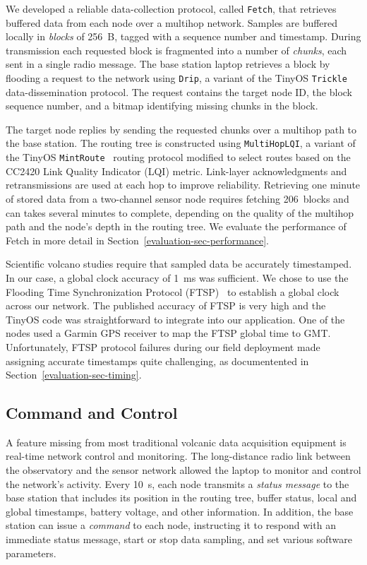 We developed a reliable data-collection protocol, called \texttt{Fetch}, that
retrieves buffered data from each node over a multihop network. Samples are
buffered locally in \textit{blocks} of 256~B, tagged with a sequence number
and timestamp. During transmission each requested block is fragmented into a
number of \textit{chunks}, each sent in a single radio message. The base
station laptop retrieves a block by flooding a request to the network using
\texttt{Drip}, a variant of the TinyOS \texttt{Trickle}~\cite{trickle}
data-dissemination protocol. The request contains the target node ID, the
block sequence number, and a bitmap identifying missing chunks in the block.

The target node replies by sending the requested chunks over a multihop path
to the base station. The routing tree is constructed using
\texttt{MultiHopLQI}, a variant of the TinyOS
\texttt{MintRoute}~\cite{awoo-multihop} routing protocol modified to select
routes based on the CC2420 Link Quality Indicator (LQI) metric. Link-layer
acknowledgments and retransmissions are used at each hop to improve
reliability. Retrieving one minute of stored data from a two-channel sensor
node requires fetching 206~blocks and can takes several minutes to complete,
depending on the quality of the multihop path and the node's depth in the
routing tree. We evaluate the performance of Fetch in more detail in
Section~\ref{evaluation-sec-performance}.

Scientific volcano studies require that sampled data be accurately
timestamped. In our case, a global clock accuracy of 1~ms was sufficient. We
chose to use the Flooding Time Synchronization Protocol (FTSP)~\cite{ftsp} to
establish a global clock across our network. The published accuracy of FTSP
is very high and the TinyOS code was straightforward to integrate into our
application. One of the nodes used a Garmin GPS receiver to map the FTSP
global time to GMT. Unfortunately, FTSP protocol failures during our field
deployment made assigning accurate timestamps quite challenging, as
documentented in Section~\ref{evaluation-sec-timing}.

\subsection{Command and Control}

A feature missing from most traditional volcanic data acquisition equipment
is real-time network control and monitoring. The long-distance radio link
between the observatory and the sensor network allowed the laptop to monitor
and control the network's activity. Every 10~s, each node transmits a
\textit{status message} to the base station that includes its position in the
routing tree, buffer status, local and global timestamps, battery voltage,
and other information. In addition, the base station can issue a
\textit{command} to each node, instructing it to respond with an immediate
status message, start or stop data sampling, and set various software
parameters.

